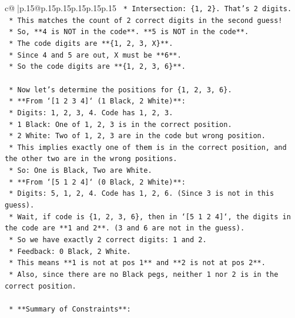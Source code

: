 \documentclass{article}
\begin{document}
{\begin{supertabular}{c@{$\;$}|p{.15\linewidth}@{}p{.15\linewidth}p{.15\linewidth}p{.15\linewidth}p{.15\linewidth}p{.15\linewidth}}
{{{\texttt{            *   Intersection: \{1, 2\}. That's 2 digits.} \\
\texttt{            *   This matches the count of 2 correct digits in the second guess!} \\
\texttt{            *   So, **4 is NOT in the code**. **5 is NOT in the code**.} \\
\texttt{            *   The code digits are **\{1, 2, 3, X\}**.} \\
\texttt{            *   Since 4 and 5 are out, X must be **6**.} \\
\texttt{            *   So the code digits are **\{1, 2, 3, 6\}**.} \\
\\ 
\texttt{    *   Now let's determine the positions for \{1, 2, 3, 6\}.} \\
\texttt{    *   **From `{[}1 2 3 4{]}` (1 Black, 2 White)**:} \\
\texttt{        *   Digits: 1, 2, 3, 4. Code has 1, 2, 3.} \\
\texttt{        *   1 Black: One of 1, 2, 3 is in the correct position.} \\
\texttt{        *   2 White: Two of 1, 2, 3 are in the code but wrong position.} \\
\texttt{        *   This implies exactly one of them is in the correct position, and the other two are in the wrong positions.} \\
\texttt{        *   So: One is Black, Two are White.} \\
\texttt{    *   **From `{[}5 1 2 4{]}` (0 Black, 2 White)**:} \\
\texttt{        *   Digits: 5, 1, 2, 4. Code has 1, 2, 6. (Since 3 is not in this guess).} \\
\texttt{        *   Wait, if code is \{1, 2, 3, 6\}, then in `{[}5 1 2 4{]}`, the digits in the code are **1 and 2**. (3 and 6 are not in the guess).} \\
\texttt{        *   So we have exactly 2 correct digits: 1 and 2.} \\
\texttt{        *   Feedback: 0 Black, 2 White.} \\
\texttt{        *   This means **1 is not at pos 1** and **2 is not at pos 2**.} \\
\texttt{        *   Also, since there are no Black pegs, neither 1 nor 2 is in the correct position.} \\
\\ 
\texttt{    *   **Summary of Constraints**:} \\
}}}
\end{supertabular}}
\end{document}

